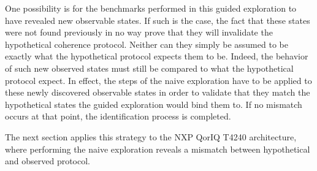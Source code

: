 One possibility is for the benchmarks performed in this guided exploration to
have revealed new observable states. If such is the case, the fact that these
states were not found previously in no way prove that they will invalidate the
hypothetical coherence protocol. Neither can they simply be assumed to be
exactly what the hypothetical protocol expects them to be. Indeed, the behavior
of such new observed states must still be compared to what the hypothetical
protocol expect. In effect, the steps of the naive exploration have to be
applied to these newly discovered observable states in order to validate that
they match the hypothetical states the guided exploration would bind them to. If
no mismatch occurs at that point, the identification process is completed.

The next section applies this strategy to the NXP QorIQ T4240 architecture,
where performing the naive exploration reveals a mismatch between hypothetical
and observed protocol.
